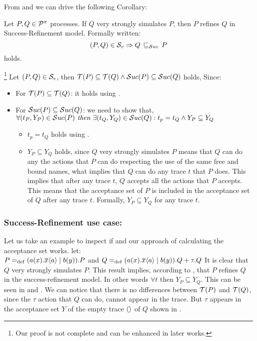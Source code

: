 From  and  we can drive the following Corollary: 

\begin{cor}
\label{cor_sim_acceptance_refinement}
Let $P,Q\in\mathcal P^{\pi}$ processes. If $Q$ very strongly simulates $P$, then $P$ refines $Q$ in Success-Refinement model. Formally written:
    \[(P,Q)\in{}\simuv \Rightarrow Q \refiSuc P\]
holds.
\end{cor}%

\begin{prf}\footnote{Our proof is not complete and can be enhanced in later works.}
Let $(P,Q)\in{}\mathcal{S}_v$, then $\Traces[P]\subseteq\Traces[Q] \wedge \Successes[P]\subseteq\Successes[Q]$ holds, Since:
\begin{itemize}
\item For $\Traces[P]\subseteq\Traces[Q]$: it holds using .
\item For $\Successes[P]\subseteq\Successes[Q]$: we need to show that,\\$\forall (t_P, Y_P) \in \Successes[P] \textit{ then } \exists (t_Q, Y_Q) \in \Successes[Q]: t_p = t_Q \wedge Y_P \subseteq Y_Q$
\begin{itemize}
\item $t_p = t_Q$ holds using .
\item $Y_P \subseteq Y_Q$ holds, since $Q$ very strongly simulates $P$ means that $Q$ can do any the actions that $P$ can do respecting the use of the same free and bound names, what implies that $Q$ can do any trace $t$ that $P$ does. This implies that after any trace $t$, $Q$ accepts all the actions that $P$ accepts. This means that the acceptance set of $P$ is included in the acceptance set of $Q$ after any trace $t$. Formally, $Y_P \subseteq Y_Q$ for any trace $t$.
\end{itemize}
\end{itemize}
\end{prf}
\subsubsection{Success-Refinement use case:}
Let us take an example to inspect if  and our approach of calculating the acceptance set works. let:\\
$P=_{\mathrm{def}}(a(x).\overline{x}\langle a\rangle \mid b(y)).P$ and 
$Q=_{\mathrm{def}}(a(x).\overline{x}\langle a\rangle \mid b(y)).Q + \tau.Q$
It is clear that $Q$ very strongly simulates $P$. This result implies, according to , that $P$ refines $Q$ in the success-refinement model. In other words $\forall t$ then $Y_P \subseteq Y_Q$.
This can be seen in  and . We can notice that there is no differences between $\Traces[P]$ and $\Traces[Q]$, since the $\tau$ action that $Q$ can do, cannot appear in the trace. But $\tau$ appears in the acceptance set $Y$ of the empty trace $\overline{}\langle\rangle$ of $Q$ shown in .

